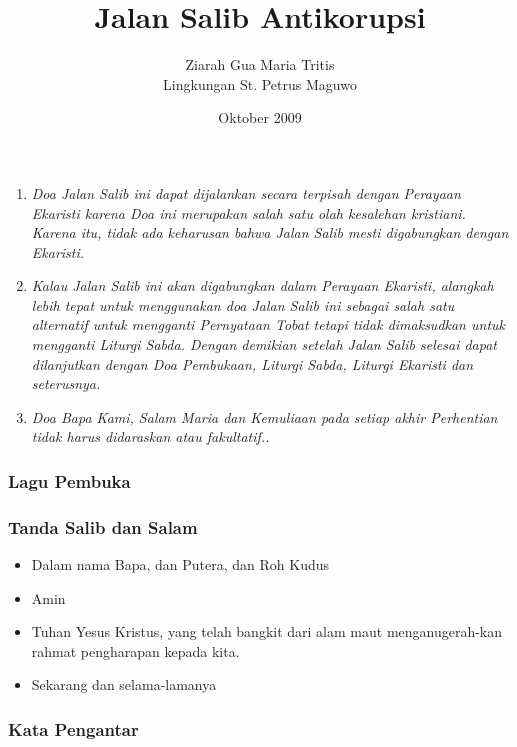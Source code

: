 \documentclass[a5paper,headsepline,titlepage,10pt,nnormalheadings,DIVcalc]{scrbook}
\title{Jalan Salib Antikorupsi}
\author{Ziarah Gua Maria Tritis\\Lingkungan St. Petrus Maguwo}
\date{Oktober 2009}
\newcommand{\BU}[1]{\begin{itemize} \item[U:] #1 \end{itemize}}
\newcommand{\BP}[1]{\begin{itemize} \item[P:] #1 \end{itemize}}
\begin{document}
\maketitle


\begin{enumerate}
\item \it{Doa Jalan Salib ini dapat dijalankan secara terpisah dengan Perayaan Ekaristi karena Doa ini merupakan salah satu olah kesalehan kristiani. Karena itu, tidak ada keharusan bahwa Jalan Salib mesti digabungkan dengan Ekaristi.}
\item \it{Kalau Jalan Salib ini akan digabungkan dalam Perayaan Ekaristi, alangkah lebih tepat untuk menggunakan doa Jalan Salib ini sebagai salah satu alternatif untuk mengganti Pernyataan Tobat tetapi tidak dimaksudkan untuk mengganti Liturgi Sabda. Dengan demikian setelah Jalan Salib selesai dapat dilanjutkan dengan Doa Pembukaan, Liturgi Sabda, Liturgi Ekaristi dan seterusnya.}
\item \it{Doa Bapa Kami, Salam Maria dan Kemuliaan pada setiap akhir Perhentian tidak harus didaraskan atau fakultatif..}
\end{enumerate}





\subsubsection*{Lagu Pembuka}

\subsubsection*{Tanda Salib dan Salam}

\BP{Dalam nama Bapa, dan Putera, dan Roh Kudus}
\BU{Amin}
\BP{Tuhan Yesus Kristus, yang telah bangkit dari alam maut menganugerah-kan rahmat pengharapan kepada kita.}
\BU{Sekarang dan selama-lamanya}

\subsubsection*{Kata Pengantar}
\end{document}
